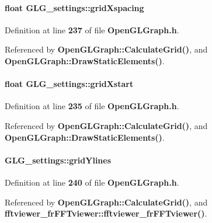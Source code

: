 \paragraph[{grid\+Xspacing}]{\setlength{\rightskip}{0pt plus 5cm}float G\+L\+G\+\_\+settings\+::grid\+Xspacing}\label{structGLG__settings_a78091af90057b1832d172e4d60b237cd}


Definition at line {\bf 237} of file {\bf Open\+G\+L\+Graph.\+h}.



Referenced by {\bf Open\+G\+L\+Graph\+::\+Calculate\+Grid()}, and {\bf Open\+G\+L\+Graph\+::\+Draw\+Static\+Elements()}.

\paragraph[{grid\+Xstart}]{\setlength{\rightskip}{0pt plus 5cm}float G\+L\+G\+\_\+settings\+::grid\+Xstart}\label{structGLG__settings_a640931e834e93bbf7827b916f617270f}


Definition at line {\bf 235} of file {\bf Open\+G\+L\+Graph.\+h}.



Referenced by {\bf Open\+G\+L\+Graph\+::\+Calculate\+Grid()}, and {\bf Open\+G\+L\+Graph\+::\+Draw\+Static\+Elements()}.

\paragraph[{grid\+Ylines}]{ G\+L\+G\+\_\+settings\+::grid\+Ylines}\label{structGLG__settings_a601e9b7fabbc2b424c248ff660d4b272}


Definition at line {\bf 240} of file {\bf Open\+G\+L\+Graph.\+h}.



Referenced by {\bf Open\+G\+L\+Graph\+::\+Calculate\+Grid()}, and {\bf fftviewer\+\_\+fr\+F\+F\+Tviewer\+::fftviewer\+\_\+fr\+F\+F\+Tviewer()}.

